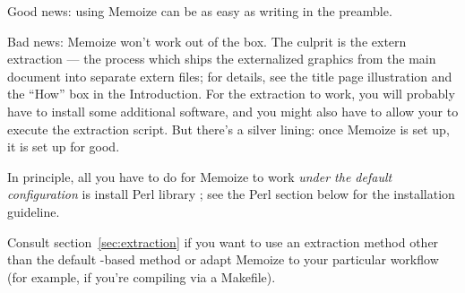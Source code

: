 \documentclass[a4paper,11pt]{article}
\begin{document}
Good news: using Memoize can be as easy as writing
\EmphVerbatim{\usepackage{memoize}} in the preamble.

Bad news: Memoize won't work out of the box.  The culprit is the extern
extraction --- the process which ships the externalized graphics from the main
document into separate extern files; for details, see the title page
illustration and the ``How'' box in the Introduction.  For the extraction to
work, you will probably have to install some additional software, and you might
also have to allow your  to execute the extraction script.  But
there's a silver lining: once Memoize is set up, it is set up for good.

\begin{tcolorbox}[title=What do I have to do?]

  In principle, all you have to do for Memoize to work \emph{under the default
    configuration} is install Perl library
  ; see the Perl section
  below for the installation guideline.

\end{tcolorbox}

Consult section~\ref{sec:extraction} if you want to use an extraction method
other than the default -based method or adapt Memoize to
your particular workflow (for example, if you're compiling via a Makefile).
\end{document}
